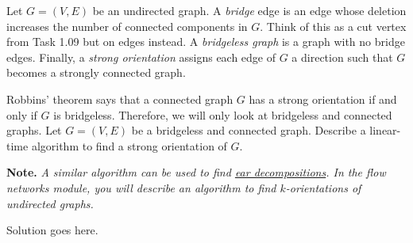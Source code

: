 \documentclass{article}
\begin{document}
\begin{question}
Let $G = (V, E)$ be an undirected graph. A {\em bridge} edge is an edge whose deletion increases the number of connected components in $G$. Think of this as a cut vertex from Task 1.09 but on edges instead. A {\em bridgeless graph} is a graph with no bridge edges. Finally, a {\em strong orientation} assigns each edge of $G$ a direction such that $G$ becomes a strongly connected graph.

Robbins' theorem says that a connected graph $G$ has a strong orientation if and only if $G$ is bridgeless. Therefore, we will only look at bridgeless and connected graphs. Let $G = (V, E)$ be a bridgeless and connected graph. Describe a linear-time algorithm to find a strong orientation of $G$.

{\bfseries Note.} {\em A similar algorithm can be used to find \href{https://en.wikipedia.org/wiki/Ear_decomposition}{ear decompositions}. In the flow networks module, you will describe an algorithm to find $k$-orientations of undirected graphs.}
\end{question}

\begin{solution}
Solution goes here.
\end{solution}
\end{document}
